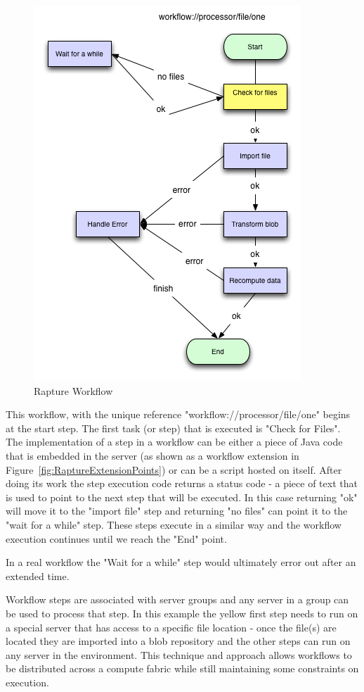 \begin{figure}[H]
\centering
\includegraphics[scale=0.75]{Graphics/RaptureWorkflowExplain}
\caption{Rapture Workflow}
\label{fig:WorkflowExample}
\end{figure}

This workflow, with the unique reference "workflow://processor/file/one" begins at the start step. The first
task (or step) that is executed is "Check for Files". The implementation of a step in a \Rapture workflow can be either
a piece of Java code that is embedded in the \Rapture server (as shown as a workflow extension in Figure~\vref{fig:RaptureExtensionPoints})
or can be a \Reflex script hosted on \Rapture itself. After doing its work the step execution code returns a status code - a piece of text
that is used to point to the next step that will be executed. In this case returning "ok" will move it to the "import file" step and returning
"no files" can point it to the "wait for a while" step. These steps execute in a similar way and the workflow execution continues until we
reach the "End" point.

In a real workflow the "Wait for a while" step would ultimately error out after an extended time.

Workflow steps are associated with server groups and any server in a group can be used to process that step. In this example the yellow first step
needs to run on a special server that has access to a specific file location - once the file(s) are located they are imported into a \Rapture blob repository
and the other steps can run on any server in the environment. This technique and approach allows \Rapture workflows to be distributed across a compute fabric while
still maintaining some constraints on execution.

